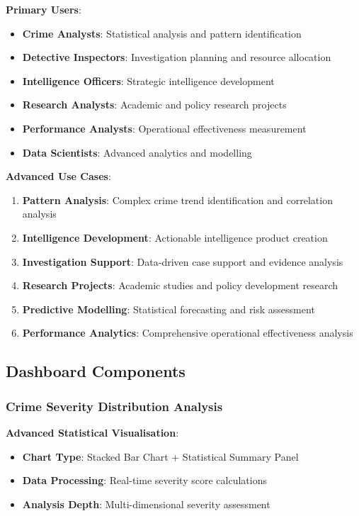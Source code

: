 \documentclass[12pt,a4paper]{article}
\begin{document}
\textbf{Primary Users}:
\begin{itemize}
    \item \textbf{Crime Analysts}: Statistical analysis and pattern identification
    \item \textbf{Detective Inspectors}: Investigation planning and resource allocation
    \item \textbf{Intelligence Officers}: Strategic intelligence development
    \item \textbf{Research Analysts}: Academic and policy research projects
    \item \textbf{Performance Analysts}: Operational effectiveness measurement
    \item \textbf{Data Scientists}: Advanced analytics and modelling
\end{itemize}

\textbf{Advanced Use Cases}:
\begin{enumerate}
    \item \textbf{Pattern Analysis}: Complex crime trend identification and correlation analysis
    \item \textbf{Intelligence Development}: Actionable intelligence product creation
    \item \textbf{Investigation Support}: Data-driven case support and evidence analysis
    \item \textbf{Research Projects}: Academic studies and policy development research
    \item \textbf{Predictive Modelling}: Statistical forecasting and risk assessment
    \item \textbf{Performance Analytics}: Comprehensive operational effectiveness analysis
\end{enumerate}

\subsection{Dashboard Components}

\subsubsection{Crime Severity Distribution Analysis}

\textbf{Advanced Statistical Visualisation}:
\begin{itemize}
    \item \textbf{Chart Type}: Stacked Bar Chart + Statistical Summary Panel
    \item \textbf{Data Processing}: Real-time severity score calculations
    \item \textbf{Analysis Depth}: Multi-dimensional severity assessment
\end{itemize}
\end{document}
